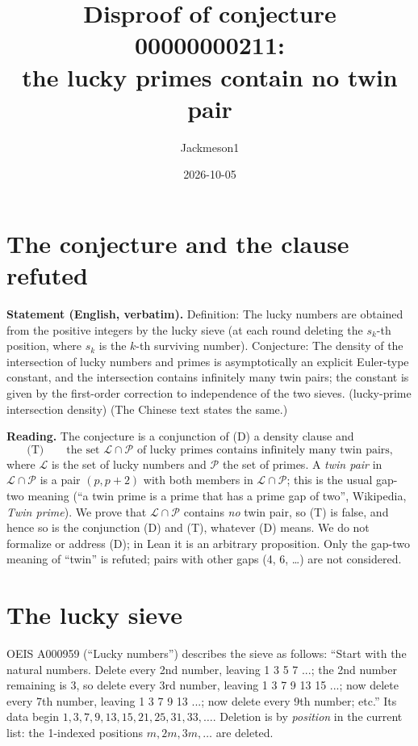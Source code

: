 \documentclass[11pt]{article}
\title{Disproof of conjecture 00000000211:\\ the lucky primes contain no twin pair}
\author{Jackmeson1}
\date{2026-10-05}
\theoremstyle{definition}
\begin{document}
\maketitle

\section{The conjecture and the clause refuted}

\textbf{Statement (English, verbatim).} Definition: The lucky numbers are obtained from the
positive integers by the lucky sieve (at each round deleting the $s_k$-th position, where $s_k$
is the $k$-th surviving number). Conjecture: The density of the intersection of lucky numbers and
primes is asymptotically an explicit Euler-type constant, and the intersection contains infinitely
many twin pairs; the constant is given by the first-order correction to independence of the two
sieves. (lucky-prime intersection density) (The Chinese text states the same.)

\textbf{Reading.} The conjecture is a conjunction of (D) a density clause and
\[
  \text{(T)}\qquad \text{the set } \mathcal{L}\cap\mathcal{P} \text{ of lucky primes contains
  infinitely many twin pairs,}
\]
where $\mathcal{L}$ is the set of lucky numbers and $\mathcal{P}$ the set of primes. A
\emph{twin pair} in $\mathcal{L}\cap\mathcal{P}$ is a pair $(p,p+2)$ with both members in
$\mathcal{L}\cap\mathcal{P}$; this is the usual gap-two meaning (``a twin prime is a prime that has
a prime gap of two'', Wikipedia, \emph{Twin prime}). We prove that $\mathcal{L}\cap\mathcal{P}$
contains \emph{no} twin pair, so (T) is false, and hence so is the conjunction (D) and (T),
whatever (D) means. We do not formalize or address (D); in Lean it is an arbitrary proposition.
Only the gap-two meaning of ``twin'' is refuted; pairs with other gaps (4, 6, \dots) are not
considered.

\section{The lucky sieve}

OEIS A000959 (``Lucky numbers'') describes the sieve as follows: ``Start with the natural numbers.
Delete every 2nd number, leaving 1 3 5 7 ...; the 2nd number remaining is 3, so delete every 3rd
number, leaving 1 3 7 9 13 15 ...; now delete every 7th number, leaving 1 3 7 9 13 ...; now delete
every 9th number; etc.'' Its data begin $1,3,7,9,13,15,21,25,31,33,\dots$. Deletion is by
\emph{position} in the current list: the 1-indexed positions $m,2m,3m,\dots$ are deleted.
\end{document}

